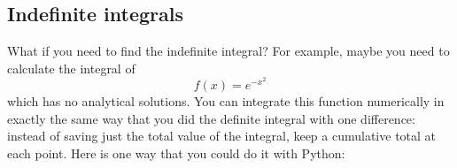 %
%
%
%
%
%
%
%
%
%
%

\subsection*{Indefinite integrals}

What if you need to find the indefinite integral? For example,
maybe you need to calculate the integral of
\begin{equation}
f(x) = e^{-x^2}
\end{equation}
which has no analytical solutions. You can integrate this function
numerically in exactly the same way that you did the definite
integral with one difference: instead of saving just the total value of the integral, keep a cumulative total at each point.  Here is
one way that you could do it with Python:

